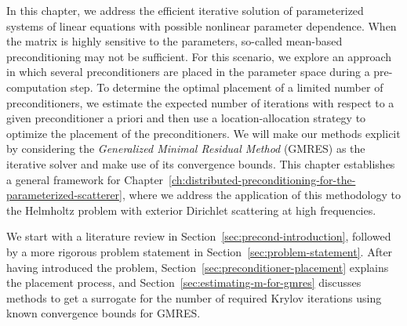 In this chapter, we address the efficient iterative solution of parameterized systems of linear equations with possible nonlinear parameter dependence.
When the matrix is highly sensitive to the parameters, so-called mean-based preconditioning may not be sufficient.
For this scenario, we explore an approach in which several preconditioners are placed in the parameter space during a pre-computation step.
To determine the optimal placement of a limited number of preconditioners, we estimate the expected number of iterations with respect to a given preconditioner a priori and then use a location-allocation strategy to optimize the placement of the preconditioners.
We will make our methods explicit by considering the \emph{Generalized Minimal Residual Method} (GMRES) as the iterative solver and make use of its convergence bounds.
This chapter establishes a general framework for Chapter~\ref{ch:distributed-preconditioning-for-the-parameterized-scatterer}, where we address the application of this methodology to the Helmholtz problem with exterior Dirichlet scattering at high frequencies.

We start with a literature review in Section~\ref{sec:precond-introduction}, followed by a more rigorous problem statement in Section~\ref{sec:problem-statement}.
After having introduced the problem, Section~\ref{sec:preconditioner-placement} explains the placement process, and Section~\ref{sec:estimating-m-for-gmres} discusses methods to get a surrogate for the number of required Krylov iterations using known convergence bounds for GMRES\@.
